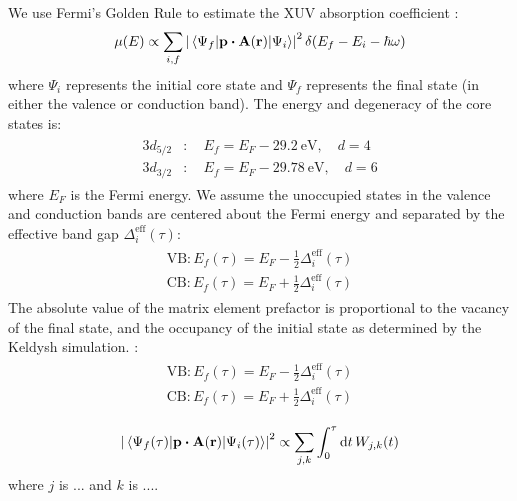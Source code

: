 We use Fermi's Golden Rule to estimate the XUV absorption coefficient \cite{rehrTheoreticalApproachesXray2000}:
\begin{equation}
\mu (E) \propto \sum_{i,f} \left| \mel{\Psi_f}{ \vb{p} \vdot \vb{A}(\vb{r}) }{\Psi_i} \right|^2 \delta(E_f - E_i - \hbar \omega)
\label{eqn:Fermis_Golden_Rule}
\end{equation}
where $\Psi_i$ represents the initial core state and $\Psi_f$ represents the final state (in either the valence or conduction band). The energy and degeneracy of the core states is:
\begin{align}
\begin{split}
3d_{5/2}&: \quad E_f = E_F - 29.2 \ \textrm{eV}, \quad d = 4  \\
3d_{3/2}&: \quad E_f = E_F - 29.78 \ \textrm{eV}, \quad d = 6
\end{split}
\end{align}
where $E_F$ is the Fermi energy. We assume the unoccupied states in the valence and conduction bands are centered about the Fermi energy and separated by the effective band gap $\Delta_i^{\textrm{eff}}(\tau)$:
\begin{align}
\begin{split}
\textrm{VB}: E_f(\tau) = E_F - \frac{1}{2} \Delta_i^{\textrm{eff}}(\tau) \\
\textrm{CB}: E_f(\tau) = E_F + \frac{1}{2} \Delta_i^{\textrm{eff}}(\tau)
\end{split}
\end{align}
The absolute value of the matrix element prefactor is proportional to the vacancy of the final state, and the occupancy of the initial state as determined by the Keldysh simulation. :
\begin{align}
\begin{split}
\textrm{VB}: E_f(\tau) = E_F - \frac{1}{2} \Delta_i^{\textrm{eff}}(\tau) \\
\textrm{CB}: E_f(\tau) = E_F + \frac{1}{2} \Delta_i^{\textrm{eff}}(\tau)
\end{split}
\end{align}

\begin{equation}
\left| \mel{\Psi_f(\tau)}{ \vb{p} \vdot \vb{A}(\vb{r}) }{\Psi_i(\tau)} \right|^2  \propto \sum_{j,k} \int_{0}^{\tau} \dd{t} W_{j,k}(t)
\end{equation}
where $j$ is ... and $k$ is ....

